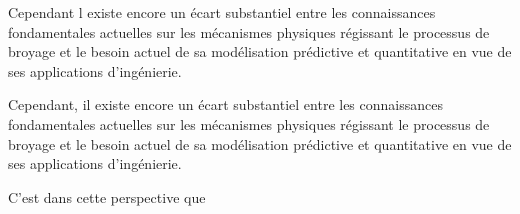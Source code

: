 Cependant l existe encore un écart substantiel entre les connaissances fondamentales actuelles sur les mécanismes physiques régissant le processus de broyage et le besoin actuel de sa modélisation prédictive et quantitative en vue de ses applications d'ingénierie.

Cependant, il existe encore un écart substantiel entre les connaissances fondamentales actuelles sur les mécanismes physiques régissant le processus de broyage et le besoin actuel de sa modélisation prédictive et quantitative en vue de ses applications d'ingénierie.

C'est dans cette perspective que
